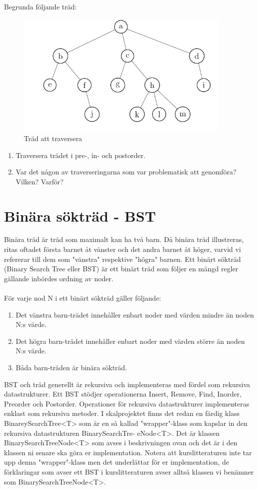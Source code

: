 \documentclass{article}
\begin{document}
Begrunda följande träd:
\begin{figure}[h]
\centering
\includegraphics[height=6cm]{graf.png}
\caption{Träd att traversera}
\end{figure}

\begin{enumerate}
\item Traversera trädet i pre-, in- och postorder.
\item Var det någon av traverseringarna som var problematisk att genomföra? Vilken? Varför?
\end{enumerate}

\section*{Binära sökträd - BST}
Binära träd är träd som maximalt kan ha två barn. Då binära träd illustreras, ritas oftadet första barnet åt vänster och det andra barnet åt höger, varvid vi refererar till dem som "vänstra" respektive "högra" barnen. Ett binärt sökträd (Binary Search Tree eller BST) är ett binärt träd som följer en mängd regler gällande inbördes ordning av noder.\\\\

För varje nod N i ett binärt sökträd gäller följande:
\begin{enumerate}
\item Det vänstra barn-trädet innehåller enbart noder med värden mindre än noden N:s
värde.
\item Det högra barn-trädet innehåller enbart noder med värden större än noden N:s värde.
\item Båda barn-träden är binära sökträd.
\end{enumerate}

BST och träd generellt är rekursiva och implementeras med fördel som rekursiva datastrukturer. Ett BST stödjer operationerna Insert, Remove, Find, Inorder, Preorder och Postorder.
Operationer för rekursiva datastrukturer implementeras enklast som rekursiva metoder.
I skalprojektet finns det redan en färdig klass BinareySearchTree<T> som är en så
kallad "wrapper"-klass som kapslar in den rekursiva datastrukturen BinarySearchTre-
eNode<T>. Det är klassen BinarySearchTreeNode<T> som avses i beskrivningen
ovan och det är i den klassen ni senare ska göra er implementation.
Notera att kurslitteraturen inte tar upp denna "wrapper"-klass men det underlättar för er implementation, de förklaringar som avser ett BST i kurslitteraturen avser alltså klassen vi benämner som BinarySearchTreeNode<T>.
\end{document}
